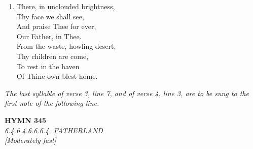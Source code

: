 \documentclass[11pt,a4paper]{article}
\begin{document}
\begin{enumerate}
    \item There, in unclouded brightness, \\
        Thy face we shall see, \\
        And praise Thee for ever, \\
        Our Father, in Thee. \\
        From the waste, howling desert, \\
        Thy children are come, \\
        To rest in the haven \\
        Of Thine own blest home.

\end{enumerate}
\vspace{1em}
\noindent \textit{The last syllable of verse 3, line 7, and of verse 4, line 3, are to be sung to the first note of the following line.}

\newpage
\begin{center}
    {\Large \textbf{HYMN 345}}
    \\
    \textit{6.4.6.4.6.6.6.4. FATHERLAND}
    \\
    \textit{\small [Moderately fast]}
\end{center}
\vspace{1em}
\end{document}
